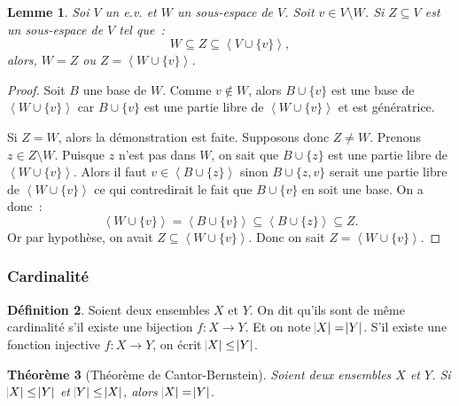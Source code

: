 \documentclass{article}
\newcommand{\eng}[1]{\left\langle#1\right\rangle}
\newtheorem{thm}{Théorème}[section]
\newtheorem{lem}[thm]{Lemme}
\theoremstyle{definition}
\newtheorem{déf}[thm]{Définition}
\theoremstyle{remark}
\begin{document}
		\begin{lem}\label{identitéSousEspaceInclus} Soi $V$ un e.v. et $W$ un sous-espace de $V$. Soit $v \in V \setminus W$. Si $Z \subseteq V$ est un sous-espace de
		$V$ tel que~: \[W \subseteq Z \subseteq \eng {V \cup \{v\}},\] alors, $W = Z$ ou $Z = \eng {W \cup \{v\}}$. \end{lem}

		\begin{proof} Soit $B$ une base de $W$. Comme $v \not \in W$, alors $B \cup \{v\}$ est une base de $\eng {W \cup \{v\}}$ car $B \cup \{v\}$ est une partie libre
		de $\eng {W \cup \{v\}}$ et est génératrice. 
		
		Si $Z = W$, alors la démonstration est faite. Supposons donc $Z \neq W$. Prenons $z \in Z \setminus W$. Puisque $z$ n'est pas dans $W$, on sait que
		$B \cup \{z\}$ est une partie libre de $\eng {W \cup \{v\}}$. Alors il faut $v \in \eng {B \cup \{z\}}$ sinon $B \cup \{z, v\}$ serait une partie libre de
		$\eng {W \cup \{v\}}$ ce qui contredirait le fait que $B \cup \{v\}$ en soit une base. On a donc~:
		\[\eng {W \cup \{v\}} = \eng {B \cup \{v\}} \subseteq \eng {B \cup \{z\}} \subseteq Z.\]
		Or par hypothèse, on avait $Z \subseteq \eng {W \cup \{v\}}$. Donc on sait $Z = \eng {W \cup \{v\}}$. \end{proof}
	
		\subsubsection{Cardinalité}
		\begin{déf} Soient deux ensembles $X$ et $Y$. On dit qu'ils sont de même cardinalité s'il existe une bijection $f : X \to Y$. Et on note $\abs X = \abs Y$.
		S'il existe une fonction injective $f : X \to Y$, on écrit $\abs X \leq \abs Y$. \end{déf}

		\begin{thm}[Théorème de Cantor-Bernstein]\label{Cantor-Bernstein} Soient deux ensembles $X$ et $Y$. Si $\abs X \leq \abs Y$ et $\abs Y \leq \abs X$,
		alors $\abs X = \abs Y$. \end{thm}
\end{document}
